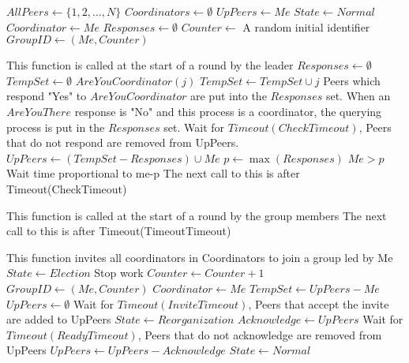 \begin{algorithmic}

\State $AllPeers \gets \{ 1, 2, ..., N \}$
\State $Coordinators \gets \emptyset$
\State $UpPeers \gets { Me }$
\State $State \gets Normal$
\State $Coordinator \gets Me$
\State $Responses \gets \emptyset$
\State $Counter \gets$ A random initial identifier
\State $GroupID \gets (Me,Counter)$

\State

    \State This function is called at the start of a round by the leader
        \State $Responses \gets \emptyset$
        \State $TempSet \gets \emptyset$
            \State $AreYouCoordinator(j)$
            \State $TempSet \gets TempSet \cup j$
        \EndFor
        \State Peers which respond "Yes" to $AreYouCoordinator$ are put into the $Responses$ set.
        \State When an $AreYouThere$ response is "No" and this process is a coordinator, the querying process is put in the $Responses$ set.
        \State Wait for $Timeout(CheckTimeout)$, Peers that do not respond are removed from UpPeers.
        \State $UpPeers \gets (TempSet-Responses) \cup {Me}$
            \Return
        \EndIf
        \State $p \gets \max(Responses)$
        \If $Me > p$
            \State Wait time proportional to me-p
        \EndIf
    \EndIf
    \State The next call to this is after Timeout(CheckTimeout)
\EndFunction

\State

    \State This function is called at the start of a round by the group members
        \Return
    \Else
        \EndIf
    \EndIf
    \State The next call to this is after Timeout(TimeoutTimeout)
\EndFunction

\State

    \State This function invites all coordinators in Coordinators to join a group led by Me
    \State $State \gets Election$
    \State Stop work
    \State $Counter \gets Counter+1$
    \State $GroupID \gets (Me,Counter)$
    \State $Coordinator \gets Me$
    \State $TempSet \gets UpPeers - {Me}$
    \State $UpPeers \gets \emptyset$
    \EndFor
    \EndFor
    \State Wait for $Timeout(InviteTimeout)$, Peers that accept the invite are added to UpPeers
    \State $State \gets Reorganization$
    \EndFor
    \State $Acknowledge \gets UpPeers$
    \State Wait for $Timeout(ReadyTimeout)$, Peers that do not acknowledge are removed from UpPeers
    \State $UpPeers \gets UpPeers - Acknowledge$
    \State $State \gets Normal$
\EndFunction


\end{algorithmic}

